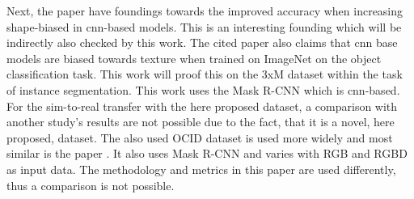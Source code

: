 		Next, the paper  \cite{Geirhos2022} have foundings towards the improved accuracy when increasing shape-biased in \ac{cnn}-based models. This is an interesting founding which will be indirectly also checked by this work. The cited paper also claims that \ac{cnn} base models are biased towards texture when trained on ImageNet on the object classification task. This work will proof this on the 3xM dataset within the task of instance segmentation. This work uses the Mask R-CNN which is \ac{cnn}-based.\\
		For the sim-to-real transfer with the here proposed dataset, a comparison with another study's results are not possible due to the fact, that it is a novel, here proposed, dataset. The also used OCID dataset \cite{Suchi2019} is used more widely and most similar is the paper  \cite{Xiang2021}. It also uses Mask R-CNN \cite{Kaiming2017} and varies with RGB and RGBD as input data. The methodology and metrics in this paper are used differently, thus a comparison is not possible. %
		
	
